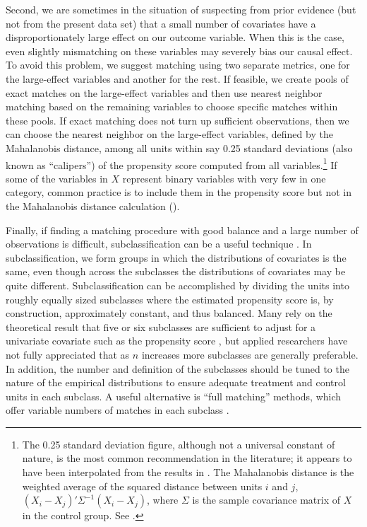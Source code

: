 \documentclass[11pt,titlepage]{article}
\begin{document}
Second, we are sometimes in the situation of suspecting from prior
evidence (but not from the present data set) that a small number of
covariates have a disproportionately large effect on our outcome
variable.  When this is the case, even slightly mismatching on these
variables may severely bias our causal effect.  To avoid this problem,
we suggest matching using two separate metrics, one for the
large-effect variables and another for the rest.  If feasible, we
create pools of exact matches on the large-effect variables and then
use nearest neighbor matching based on the remaining variables to
choose specific matches within these pools.  If exact matching does
not turn up sufficient observations, then we can choose the nearest
neighbor on the large-effect variables, defined by the Mahalanobis
distance, among all units within say 0.25 standard deviations (also
known as ``calipers'') of the propensity score computed from all
variables.\footnote{The 0.25 standard deviation figure, although not a
  universal constant of nature, is the most common recommendation in
  the literature; it appears to have been interpolated from the
  results in \citet{CocRub73}.  The Mahalanobis distance is the
  weighted average of the squared distance between units $i$ and $j$,
  $(X_i-X_j)'\Sigma^{-1}(X_i-X_j)$, where $\Sigma$ is the sample
  covariance matrix of $X$ in the control group.  See
  \cite{RubTho00}.}  If some of the variables in $X$ represent binary
variables with very few in one category, common practice is to include
them in the propensity score but not in the Mahalanobis distance
calculation (\citealp{GuRos93, RubTho00}).

Finally, if finding a matching procedure with good balance and a large
number of observations is difficult, subclassification can be a useful
technique \citep{ImaDyk04}.  In subclassification, we form groups in
which the distributions of covariates is the same, even though across
the subclasses the distributions of covariates may be quite different.
Subclassification can be accomplished by dividing the units into
roughly equally sized subclasses where the estimated propensity score
is, by construction, approximately constant, and thus balanced.  Many
rely on the theoretical result that five or six subclasses are
sufficient to adjust for a univariate covariate such as the propensity
score \citep{Cochran68,RosRub84}, but applied researchers have not
fully appreciated that as $n$ increases more subclasses are generally
preferable.  In addition, the number and definition of the subclasses
should be tuned to the nature of the empirical distributions to ensure
adequate treatment and control units in each subclass.  A useful
alternative is ``full matching'' methods, which offer variable numbers
of matches in each subclass \citep{Hansen04}.
\end{document}
